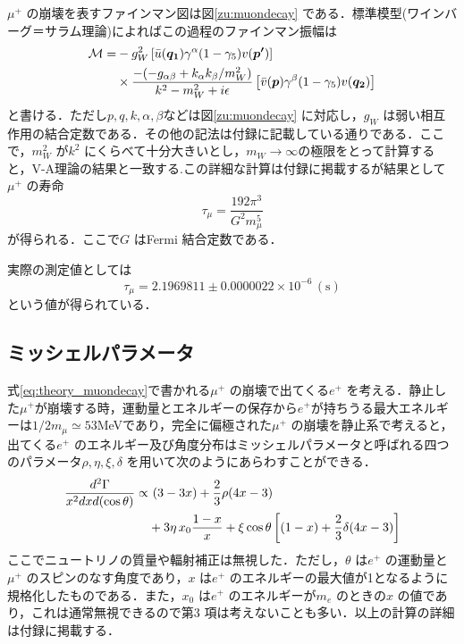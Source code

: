 	$\mu^{+}$ の崩壊を表すファインマン図は図\ref{zu:muondecay} である．標準模型(ワインバーグ＝サラム理論)によればこの過程のファインマン振幅は
	\begin{align}
	\mathcal{M} = &-g_{W}^2\left[\Bar{u}(\bm{q_{1}})\gamma^{\alpha}(1 - \gamma_{5})v(\bm{p'})\right] \notag \\ 
	&\times \frac{-(-g_{\alpha\beta} + k_{\alpha}k_{\beta}/m_{W}^2)}{k^{2} - m_{W}^2 + i\epsilon}\left[\Bar{v}(\bm{p})\gamma^{\beta}(1 - \gamma_5)v(\bm{q_{2}})\right]
	\label{eq:theory_muondecayamp}
	\end{align}
	と書ける．ただし$p, q, k, \alpha, \beta$などは図\ref{zu:muondecay} に対応し，$g_{W}$ は弱い相互作用の結合定数である．その他の記法は付録に記載している通りである．ここで，$m_{W}^2$ が$k^2$ にくらべて十分大きいとし，$m_{W} \rightarrow \infty$の極限をとって計算すると，V-A理論の結果と一致する.この詳細な計算は付録に掲載するが結果として$\mu^+$ の寿命
	\begin{equation}
	\tau_{\mu} = \frac{192\pi^3}{G^{2} m_{\mu}^{5}}
        \label{eq:thory_muonlifetime}
	\end{equation}
	が得られる．ここで$G$ はFermi 結合定数である．

	実際の測定値としては
	\[\tau_{\mu} = 2.1969811 \pm 0.0000022 \times 10^{-6} \,(\mathrm{s})\]
	という値が得られている．\cite{PDG}
	
	\subsection{ミッシェルパラメータ}
	式\eqref{eq:theory_muondecay}で書かれる$\mu^{+}$ の崩壊で出てくる$e^{+}$ を考える．静止した$\mu^{+}$が崩壊する時，運動量とエネルギーの保存から$e^{+}$が持ちうる最大エネルギーは$1/2 m_{\mu} \simeq 53$MeVであり，完全に偏極された$\mu^{+}$ の崩壊を静止系で考えると，出てくる$e^{+}$ のエネルギー及び角度分布はミッシェルパラメータと呼ばれる四つのパラメータ$\rho, \eta, \xi, \delta$ を用いて次のようにあらわすことができる．\cite{michel_parameter}
	\begin{align}
	\frac{d^2\Gamma}{x^{2}dxd(\cos \theta)} \propto& \,\,(3 - 3x) + \frac{2}{3}\rho (4x - 3) \notag \\
	&+ 3 \eta \,x_{0} \frac{1-x}{x} + \xi \cos \theta \left[(1 - x) + \frac{2}{3} \delta (4x - 3)\right]
	\label{eq:theory_michel}
	\end{align}
	ここでニュートリノの質量や輻射補正は無視した．ただし，$\theta$ は$e^{+}$ の運動量と$\mu^{+}$ のスピンのなす角度であり，$x$ は$e^{+}$ のエネルギーの最大値が1となるように規格化したものである．また，$x_0$ は$e^{+}$ のエネルギーが$m_{e}$ のときの$x$ の値であり，これは通常無視できるので第3 項は考えないことも多い．以上の計算の詳細は付録に掲載する．

